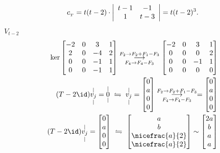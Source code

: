 \textcolor{gris}{\[c_{_T} = t(t-2) \cdot \left| \begin{array}{c c }t-1 & -1\\ 1 & t-3 \end{array}\right|= t(t-2)^3.\]
\({V_{t-2}}\)   
{\small \vspace{-0.5cm}\begin{align*}
  \ker \begin{bmatrix}
 -2 & 0 & 3 & 1 \\ 
2 & 0 & -4 & 2 \\ 
0 & 0 & -1 & 1 \\ 
0 & 0 & -1 & 1    
  \end{bmatrix} \underset{F_4 \to F_4 - F_3}{\overset{F_2 \to F_2 + F_1- F_3}{\longrightarrow}}
\begin{bmatrix}
 -2 & 0 & 3 & 1 \\ 
0 & 0 & 0 & 2 \\ 
0 & 0 & -1 & 1 \\ 
0 & 0 & 0 & 0    
  \end{bmatrix} \\ 
  (T-2\id)\overset{|}{\underset{|}{v_j}} = \overset{|}{\underset{|}{0}} \ \leftrightharpoons \ \overset{|}{\underset{|}{v_j}} = \begin{bmatrix}
    0 \\ a \\ 0 \\ 0
  \end{bmatrix}\underset{F_4 \to F_4 - F_3}{\overset{F_2 \to F_2 + F_1- F_3}{\longrightarrow}} = \begin{bmatrix}
   0 \\ a \\ 0 \\0 
  \end{bmatrix} \\ 
  (T-2\id)\overset{|}{\underset{|}{v_j}} = \begin{bmatrix}
    0 \\ a \\ 0 \\ 0
  \end{bmatrix} \ \leftrightharpoons \ \begin{bmatrix}
   a \\ b \\ \nicefrac{a}{2} \\ \nicefrac{a}{2} 
  \end{bmatrix} \sim \begin{bmatrix}
   2a \\ b \\ a \\ a 

\end{bmatrix}
\end{align*}}}
